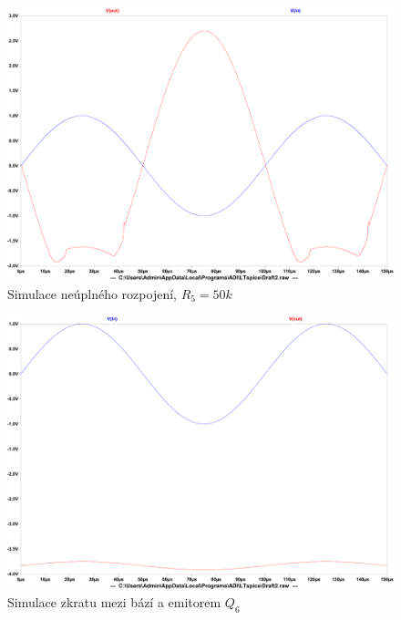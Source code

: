 \documentclass{article}
\begin{document}
\begin{figure}[H]
  \centering
  \includegraphics[width=\textwidth]{sim/porucha-5/tran-neuplne-rozpojeni.pdf}
  \caption{Simulace neúplného rozpojení, \(R_5 = 50k\)}
  \label{tran-porucha5-neuplna}
\end{figure}



\begin{figure}[H]
  \centering
  \includegraphics[width=\textwidth]{sim/porucha-6/tran.pdf}
  \caption{Simulace zkratu mezi bází a emitorem \(Q_6\)}
  \label{tran-porucha6}
\end{figure}

\end{document}
